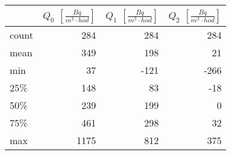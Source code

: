 \begin{tabular}{lrrr}
\toprule
{} &  $Q_0$ $\left[\si{\frac{Bq}{m^3\cdot hod}}\right]$ &  $Q_1$ $\left[\si{\frac{Bq}{m^3\cdot hod}}\right]$ &  $Q_2$ $\left[\si{\frac{Bq}{m^3\cdot hod}}\right]$ \\
\midrule
count &                                                284 &                                                284 &                                                284 \\
mean  &                                                349 &                                                198 &                                                 21 \\
min   &                                                 37 &                                               -121 &                                               -266 \\
25\%   &                                                148 &                                                 83 &                                                -18 \\
50\%   &                                                239 &                                                199 &                                                  0 \\
75\%   &                                                461 &                                                298 &                                                 32 \\
max   &                                               1175 &                                                812 &                                                375 \\
\bottomrule
\end{tabular}
